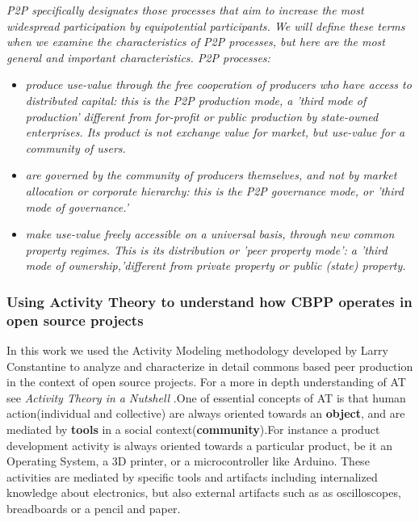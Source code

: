 \documentclass{ICED-Paper}%
\begin{document}
\emph{P2P specifically designates those processes that aim to increase the most widespread participation by equipotential participants. We will define these terms when we examine the characteristics of P2P processes, but here are the most general and important characteristics.
P2P processes:}

\begin{itemize}
  \item \emph{produce use-value through the free cooperation of producers who have access to distributed capital: this is the P2P production mode, a 'third mode of production' different from for-profit or public production by state-owned enterprises. Its product is not exchange value for market, but use-value for a community of users.}
  \item \emph{are governed by the community of producers themselves, and not by market allocation or corporate hierarchy: this is the P2P governance mode, or 'third mode of governance.'}
  \item \emph{make use-value freely accessible on a universal basis, through new common property regimes. This is its distribution or 'peer property mode': a 'third mode of ownership,'different from private property or public (state) property.}
\end{itemize}

\subsubsection{Using Activity Theory to understand how CBPP operates in open source projects}
In this work we used the Activity Modeling methodology developed by Larry Constantine to analyze and characterize in detail commons based peer production in the context of open source projects\cite{Constantine}. For a more in depth understanding of AT see \emph{Activity Theory in a Nutshell} \cite{ATnuthsell}.One of essential concepts of AT is that human action(individual and collective) are always oriented towards an \textbf{object}, and are mediated by \textbf{tools} in a social context(\textbf{community}).For instance a product development activity is always oriented towards a particular product, be it an Operating System, a 3D printer, or a microcontroller like Arduino. These activities are mediated by specific tools and artifacts including internalized knowledge about electronics, but also external artifacts such as as oscilloscopes, breadboards or a pencil and paper.
\end{document}
